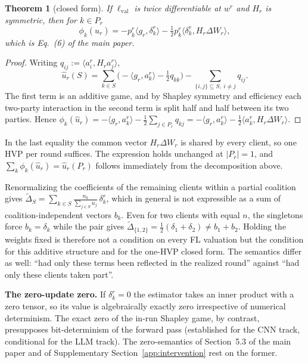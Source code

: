 \documentclass[letterpaper]{article} %
\theoremstyle{plain}
\newtheorem{theorem}{Theorem}
\newcommand{\lval}{\ell_{\mathrm{val}}}
\begin{document}
\begin{theorem}[closed form]
\label{thm:closed}
If $\lval$ is twice differentiable at $w^r$ and $H_r$ is symmetric, then for
$k \in P_r$
\[
\phi_k(\hat u_r)
= -p_k^r \langle g_r, \delta_k^r\rangle
- \tfrac12 p_k^r \langle \delta_k^r, H_r \Delta W_r\rangle,
\]
which is Eq.~(6) of the main paper.
\end{theorem}

\begin{proof}
Writing $q_{ij} := \langle a_i^r, H_r a_j^r\rangle$,
\[
\hat u_r(S)
= \sum_{k \in S}\Big(-\langle g_r, a_k^r\rangle - \tfrac12 q_{kk}\Big)
- \sum_{\{i,j\} \subseteq S,\; i \ne j} q_{ij}.
\]
The first term is an additive game, and by Shapley symmetry and efficiency
each two-party interaction in the second term is split half and half between
its two parties. Hence
$\phi_k(\hat u_r) = -\langle g_r, a_k^r\rangle
- \tfrac12 \sum_{j \in P_r} q_{kj}
= -\langle g_r, a_k^r\rangle - \tfrac12 \langle a_k^r, H_r \Delta W_r\rangle$.
\end{proof}

In the last equality the common vector $H_r \Delta W_r$ is shared by every
client, so one HVP per round suffices. The expression holds unchanged at
$|P_r| = 1$, and $\sum_k \phi_k(\hat u_r) = \hat u_r(P_r)$ follows
immediately from the decomposition above.

Renormalizing the coefficients of the remaining clients within a partial
coalition gives
$\widetilde\Delta_S
= \sum_{k \in S} \frac{n_k}{\sum_{j \in S} n_j}\, \delta_k^r$,
which in general is not expressible as a sum of coalition-independent vectors
$b_k$. Even for two clients with equal $n$, the singletons force
$b_k = \delta_k$ while the pair gives
$\widetilde\Delta_{\{1,2\}} = \tfrac12(\delta_1 + \delta_2) \ne b_1 + b_2$.
Holding the weights fixed is therefore not a condition on every FL valuation
but the condition for this additive structure and for the one-HVP closed
form. The semantics differ as well: ``had only these terms been reflected in
the realized round'' against ``had only these clients taken part''.

\textbf{The zero-update zero.} If $\delta_k^r = 0$ the estimator takes an
inner product with a zero tensor, so its value is algebraically exactly zero
irrespective of numerical determinism. The exact zero of the in-run Shapley
game, by contrast, presupposes bit-determinism of the forward pass
(established for the CNN track, conditional for the LLM track). The
zero-semantics of Section~5.3 of the main paper and of Supplementary
Section~\ref{app:intervention} rest on the former.
\end{document}
